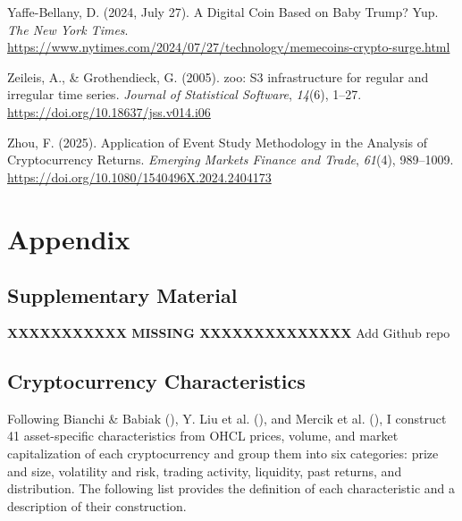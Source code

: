 \documentclass[
  12pt,
  a4paper,
  openany]{scrbook}
\newlength{\cslhangindent}
\newenvironment{CSLReferences}[2] %
 {\begin{list}{}{%
  \setlength{\itemindent}{0pt}
  \setlength{\leftmargin}{0pt}
  \setlength{\parsep}{0pt}
  \ifodd #1
   \setlength{\leftmargin}{\cslhangindent}
   \setlength{\itemindent}{-1\cslhangindent}
  \fi
  \setlength{\itemsep}{#2\baselineskip}}}
 {\end{list}}
\begin{document}
\begin{CSLReferences}{1}{0}
Yaffe-Bellany, D. (2024, July 27). A Digital Coin Based on Baby Trump?
Yup. \emph{The New York Times}.
\url{https://www.nytimes.com/2024/07/27/technology/memecoins-crypto-surge.html}

Zeileis, A., \& Grothendieck, G. (2005). {zoo}: S3 infrastructure for
regular and irregular time series. \emph{Journal of Statistical
Software}, \emph{14}(6), 1--27.
\url{https://doi.org/10.18637/jss.v014.i06}

Zhou, F. (2025). Application of Event Study Methodology in the Analysis
of Cryptocurrency Returns. \emph{Emerging Markets Finance and Trade},
\emph{61}(4), 989--1009.
\url{https://doi.org/10.1080/1540496X.2024.2404173}

\end{CSLReferences}

\cleardoublepage
{}
{}
\appendix

\chapter{Appendix}\label{appendix}

\section{Supplementary Material}\label{sec-app_material}

\textbf{XXXXXXXXXXX MISSING XXXXXXXXXXXXXX} Add Github repo

\section{Cryptocurrency Characteristics}\label{sec-app_characteristics}

Following Bianchi \& Babiak
(), Y. Liu et
al. (), and Mercik et al.
(),
I construct 41 asset-specific characteristics from OHCL prices, volume,
and market capitalization of each cryptocurrency and group them into six
categories: prize and size, volatility and risk, trading activity,
liquidity, past returns, and distribution. The following list provides
the definition of each characteristic and a description of their
construction.
\end{document}
